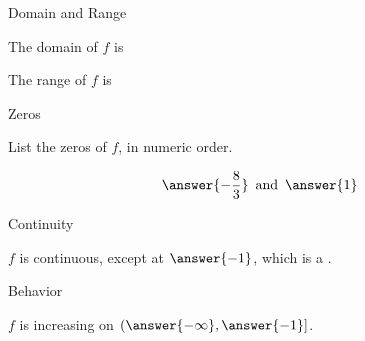 \documentclass{ximera}
\begin{document}
\begin{exercise}
\begin{question}
\end{question}






\begin{question} Domain and Range



The domain of $f$ is
\begin{multipleChoice}
\choice {$(-\infty, 5]$}
\choice [correct]{$(-\infty, \infty)$}
\end{multipleChoice}





The range of $f$ is
\begin{multipleChoice}
\choice {$(-\infty, 1]$}
\choice [correct]{$(-\infty, 5]$}
\end{multipleChoice}


\end{question}







\begin{question} Zeros


List the zeros of $f$, in numeric order.

\[
\answer{-\frac{8}{3}} \, \text{ and } \, \answer{1}
\]



\end{question}









\begin{question} Continuity


$f$ is continuous, except at $\answer{-1}$, which is a .



\end{question}










\begin{question} Behavior


$f$ is increasing on $\left( \answer{-\infty}, \answer{-1} \right]$. \\


\end{question}
\end{exercise}
\end{document}
